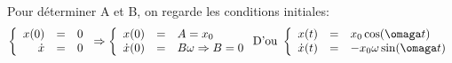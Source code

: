	Pour déterminer A et B, on regarde les conditions initiales:
	\[\left\{\begin{array}{rcl}
				x(0) &=& 0 \\
				\dot{x} &=& 0
		\end{array}\right.
	\Rightarrow 
	\left\{\begin{array}{rcl}
		x(0) &=& A = x_0 \\
		\dot{x}(0) &=& B\omega \Rightarrow B=0\end{array}\right.
			\text{D'ou } \left\{
			\begin{array}{rcl}
			x(t) &=& x_0\cos(\omaga t) \\
		\dot{x}(t) &=& -x_0\omega\sin(\omaga t) \end{array}\right.\]
